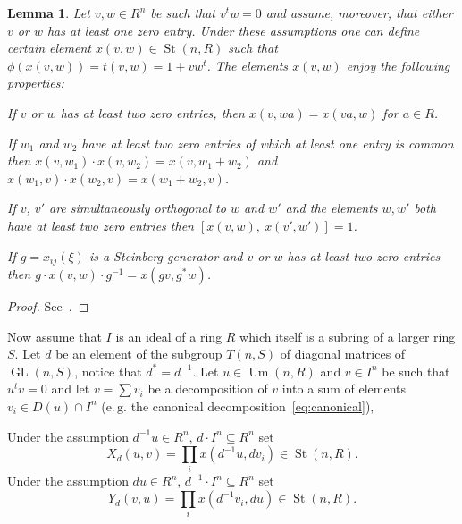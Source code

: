\documentclass[oneside, 10pt]{amsart}
\DeclareMathOperator{\St}{St}
\DeclareMathOperator{\Um}{Um}
\DeclareMathOperator{\GL}{GL}
\numberwithin{equation}{section}
\newtheorem{lemma}{Lemma}
\numberwithin{lemma}{section}
\theoremstyle{definition}
\theoremstyle{remark}
\begin{document}
\begin{lemma} \label{lem:xsmall-properties}
 Let $v, w \in R^n$ be such that $v^t w = 0$ and assume, moreover, that either $v$ or $w$ has at least one zero entry.
 Under these assumptions one can define certain element $x(v, w) \in \St(n, R)$ such that $\phi(x(v, w)) = t(v, w) = 1 + vw^t$.
 The elements $x(v, w)$ enjoy the following properties:
 \begin{lemlist}
  \item \label{item:xsmall-scalar} If $v$ or $w$ has at least two zero entries, then $x(v, wa) = x(va, w)$ for $a\in R$. 
  \item \label{item:xsmall-additivity} If $w_1$ and $w_2$ have at least two zero entries of which at least one entry is common
   then $x(v, w_1) \cdot x(v, w_2) = x(v, w_1+w_2)$ and $x(w_1, v) \cdot x(w_2, v) = x(w_1 + w_2, v)$.
  \item \label{item:xsmall-commute} If $v$, $v'$ are simultaneously orthogonal to $w$ and $w'$ and the elements $w, w'$ both have at least two zero entries then 
   $[x(v, w),\ x(v', w')] = 1$.
  \item \label{item:xsmall-conj} If $g = x_{ij}(\xi)$ is a Steinberg generator and $v$ or $w$ has at least two zero entries then
   $g \cdot x(v, w) \cdot g^{-1} = x(gv, g^*w)$.
 \end{lemlist}
\end{lemma}
\begin{proof}
 See~\cite[Lemma~1.1]{Tu83}.
\end{proof}

Now assume that $I$ is an ideal of a ring $R$ which itself is a subring of a larger ring $S$. 
Let $d$ be an element of the subgroup $T(n, S)$ of diagonal matrices of $\GL(n, S)$, notice that $d^* = d^{-1}$.
Let $u \in \Um(n, R)$ and $v \in I^n$ be such that $u^tv = 0$ and let $v = \sum v_i$ 
 be a decomposition of $v$ into a sum of elements $v_i \in D(u) \cap I^n$ (e.\,g. the canonical decomposition~\eqref{eq:canonical}),
 
Under the assumption $d^{-1}u \in R^n$, $d \cdot I^n \subseteq R^n$ set 
 \begin{equation} X_d(u, v) = \prod_i x(d^{-1}u, dv_i) \in \St(n, R). \end{equation}
Under the assumption $d u\in R^n$, $d^{-1} \cdot I^n \subseteq R^n$ set 
 \begin{equation} Y_d(v, u) = \prod_i x(d^{-1} v_i, du) \in \St(n, R). \end{equation}
\end{document}

